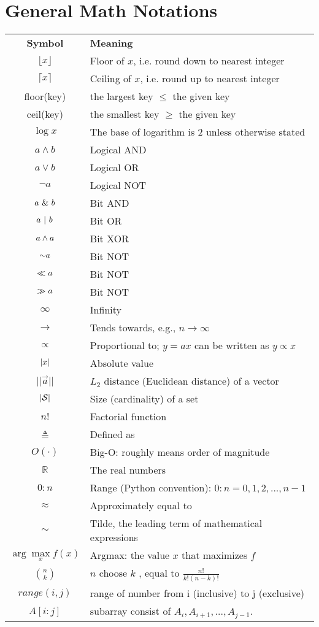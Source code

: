 \label{sec:Notation}

\section*{General Math Notations}

\begin{longtable}{cl}
\hline\noalign{\smallskip}
\textbf{Symbol} & \textbf{Meaning} \\
\noalign{\smallskip}\hline\noalign{\smallskip}
$\lfloor x \rfloor$ & Floor of $x$, i.e. round down to nearest integer\\
$\lceil x \rceil$ & Ceiling of $x$, i.e. round up to nearest integer\\
floor(key) & the largest key $\leq$ the given key \\
ceil(key) & the smallest key $\geq$ the given key \\
$\log x$ & The base of logarithm is 2 unless otherwise stated\\
$a \wedge b$ & Logical AND\\
$a \vee b$ & Logical OR\\
$\neg a $ & Logical NOT\\
$a\ \&\  b$ & Bit AND\\
$a \ |\  b$ & Bit OR\\
$a \wedge  a$ & Bit XOR\\
$\mathord{\sim} a$ & Bit NOT\\
$\ll a$ & Bit NOT\\
$\gg a$ & Bit NOT\\
$\infty$ & Infinity\\
$\rightarrow$ & Tends towards, e.g., $n \rightarrow \infty$\\
$\propto$ &Proportional to; $y = ax$ can be written as $y \propto x$\\
$\left\lvert x\right\rvert$ & Absolute value\\
$||\vec{a}||$ & $L_2$ distance (Euclidean distance) of a vector \\
$\left\lvert\mathcal{S}\right\rvert$ & Size (cardinality) of a set\\
$n!$ & Factorial function\\
$\triangleq$ & Defined as\\
$O(\cdot)$ & Big-O: roughly means order of magnitude\\
$\mathbb{R}$ & The real numbers\\
$0:n$ & Range (Python convention): $0:n = {0, 1, 2,...,n-1}$\\
$\approx$ & Approximately equal to\\
$\sim$ & Tilde, the leading term of mathematical expressions \\
$\arg\max\limits_x f(x)$ & Argmax: the value $x$ that maximizes $f$\\
$\binom{n}{k}$ & $n$ choose $k$ , equal to $\frac{n!}{k!(n-k)!}$\\
$range(i,j)$ & range of number from i (inclusive) to j (exclusive) \\
$A[i:j]$ & subarray consist of $A_i, A_{i+1}, ..., A_{j-1}$.
\noalign{\smallskip}\hline\noalign{\smallskip}
\end{longtable}


\twocolumn
